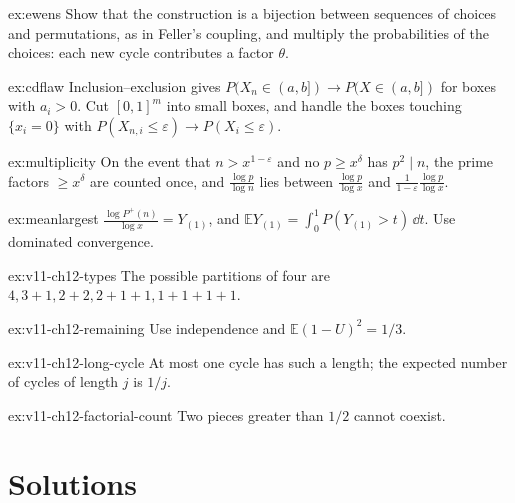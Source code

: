\begin{hint}{ex:ewens}
Show that the construction is a bijection between sequences of choices and permutations, as in Feller's coupling, and multiply the probabilities of the choices: each new cycle contributes a factor $\theta$.
\end{hint}

\begin{hint}{ex:cdflaw}
Inclusion--exclusion gives $P(X_n\in(a,b])\to P(X\in(a,b])$ for boxes with $a_i>0$. Cut $[0,1]^m$ into small boxes, and handle the boxes touching $\{x_i=0\}$ with $P(X_{n,i}\le\varepsilon)\to P(X_i\le\varepsilon)$.
\end{hint}

\begin{hint}{ex:multiplicity}
On the event that $n>x^{1-\varepsilon}$ and no $p\ge x^{\delta}$ has $p^2\mid n$, the prime factors $\ge x^\delta$ are counted once, and $\frac{\log p}{\log n}$ lies between $\frac{\log p}{\log x}$ and $\frac1{1-\varepsilon}\frac{\log p}{\log x}$.
\end{hint}

\begin{hint}{ex:meanlargest}
$\frac{\log P^+(n)}{\log x}=Y_{(1)}$, and $\mathbb EY_{(1)}=\int_0^1P(Y_{(1)}>t)\,\dd t$. Use dominated convergence.
\end{hint}

\begin{hint}{ex:v11-ch12-types}
The possible partitions of four are $4,3+1,2+2,2+1+1,1+1+1+1$.
\end{hint}

\begin{hint}{ex:v11-ch12-remaining}
Use independence and $\mathbb E(1-U)^2=1/3$.
\end{hint}

\begin{hint}{ex:v11-ch12-long-cycle}
At most one cycle has such a length; the expected number of cycles of length $j$ is $1/j$.
\end{hint}

\begin{hint}{ex:v11-ch12-factorial-count}
Two pieces greater than $1/2$ cannot coexist.
\end{hint}

\section{Solutions}

